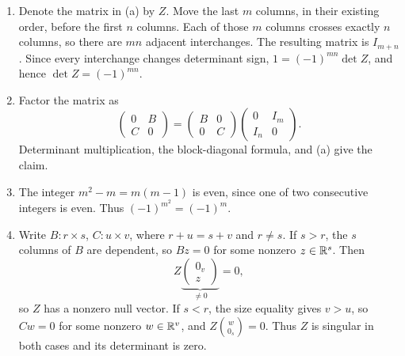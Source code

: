 \begin{solution}
\begin{enumerate}
\item Denote the matrix in (a) by \(Z\).
Move the last \(m\) columns, in their existing order, before the
first \(n\) columns. Each of those \(m\) columns crosses exactly \(n\)
columns, so there are \(mn\) adjacent interchanges. The resulting matrix
is \(I_{m+n}\). Since every interchange changes determinant sign,
\(1=(-1)^{mn}\det Z\), and hence \(\det Z=(-1)^{mn}\).
\item Factor the matrix as
\[
\begin{pmatrix}0&B\\C&0\end{pmatrix}
=\begin{pmatrix}B&0\\0&C\end{pmatrix}
\begin{pmatrix}0&I_m\\I_n&0\end{pmatrix}.
\]
Determinant multiplication, the block-diagonal formula, and (a) give the claim.
\item The integer \(m^2-m=m(m-1)\) is even, since one of two consecutive
integers is even. Thus \((-1)^{m^2}=(-1)^m\).
\item Write \(B:r\times s\), \(C:u\times v\), where \(r+u=s+v\)
and \(r\ne s\). If \(s>r\), the \(s\) columns of \(B\) are dependent,
so \(Bz=0\) for some nonzero \(z\in\mathbb R^s\). Then
\[
Z\underbrace{\begin{pmatrix}0_v\\z\end{pmatrix}}_{\ne0}=0,
\]
so \(Z\) has a nonzero null vector.
If \(s<r\), the size equality gives \(v>u\), so \(Cw=0\) for some
nonzero \(w\in\mathbb R^v\), and \(Z\binom{w}{0_s}=0\).
Thus \(Z\) is singular in both cases and its determinant is zero.
\end{enumerate}
\end{solution}

